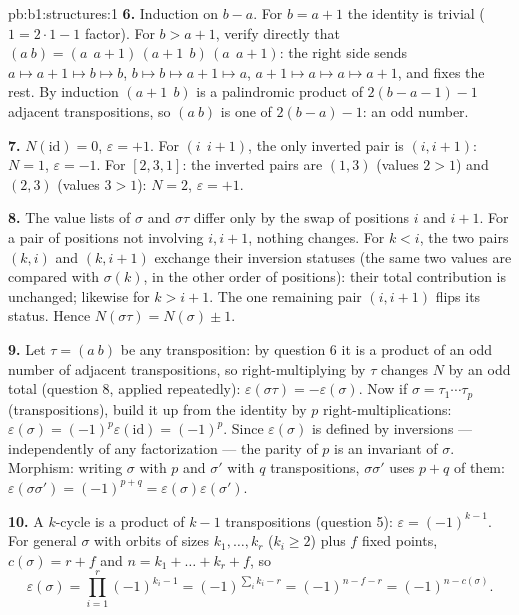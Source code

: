 \begin{solution}{pb:b1:structures:1}
\textbf{6.} Induction on $b - a$. For $b = a + 1$ the identity is
trivial ($1 = 2\cdot1 - 1$ factor). For $b > a + 1$, verify
directly that $(a\ b) = (a\ \ a{+}1)\,(a{+}1\ \ b)\,(a\ \ a{+}1)$:
the right side sends $a \mapsto a{+}1 \mapsto b \mapsto b$, $b
\mapsto b \mapsto a{+}1 \mapsto a$, $a{+}1 \mapsto a \mapsto a
\mapsto a{+}1$, and fixes the rest. By induction $(a{+}1\ \ b)$ is
a palindromic product of $2(b - a - 1) - 1$ adjacent
transpositions, so $(a\ b)$ is one of $2(b - a) - 1$: an odd
number.

\textbf{7.} $N(\mathrm{id}) = 0$, $\varepsilon = +1$. For $(i\ \
i{+}1)$, the only inverted pair is $(i, i+1)$: $N = 1$,
$\varepsilon = -1$. For $[2, 3, 1]$: the inverted pairs are $(1,
3)$ (values $2 > 1$) and $(2, 3)$ (values $3 > 1$): $N = 2$,
$\varepsilon = +1$.

\textbf{8.} The value lists of $\sigma$ and $\sigma\tau$ differ
only by the swap of positions $i$ and $i + 1$. For a pair of
positions not involving $i, i+1$, nothing changes. For $k < i$,
the two pairs $(k, i)$ and $(k, i+1)$ exchange their inversion
statuses (the same two values are compared with $\sigma(k)$, in
the other order of positions): their total contribution is
unchanged; likewise for $k > i + 1$. The one remaining pair $(i,
i+1)$ flips its status. Hence $N(\sigma\tau) = N(\sigma) \pm 1$.

\textbf{9.} Let $\tau = (a\ b)$ be any transposition: by
question 6 it is a product of an odd number of adjacent
transpositions, so right-multiplying by $\tau$ changes $N$ by an
odd total (question 8, applied repeatedly): $\varepsilon(\sigma
\tau) = -\varepsilon(\sigma)$. Now if $\sigma = \tau_1\cdots
\tau_p$ (transpositions), build it up from the identity by $p$
right-multiplications: $\varepsilon(\sigma) =
(-1)^p\varepsilon(\mathrm{id}) = (-1)^p$. Since
$\varepsilon(\sigma)$ is defined by inversions --- independently
of any factorization --- the parity of $p$ is an invariant of
$\sigma$. Morphism: writing $\sigma$ with $p$ and $\sigma'$ with
$q$ transpositions, $\sigma\sigma'$ uses $p + q$ of them:
$\varepsilon(\sigma\sigma') = (-1)^{p+q} =
\varepsilon(\sigma)\varepsilon(\sigma')$.

\textbf{10.} A $k$-cycle is a product of $k - 1$ transpositions
(question 5): $\varepsilon = (-1)^{k-1}$. For general $\sigma$
with orbits of sizes $k_1, \dots, k_r$ ($k_i \geq 2$) plus $f$
fixed points, $c(\sigma) = r + f$ and $n = k_1 + \dots + k_r + f$,
so
\[
\varepsilon(\sigma) = \prod_{i=1}^r (-1)^{k_i - 1}
= (-1)^{\sum_i k_i - r} = (-1)^{n - f - r} = (-1)^{n -
c(\sigma)} .
\]


\end{solution}
